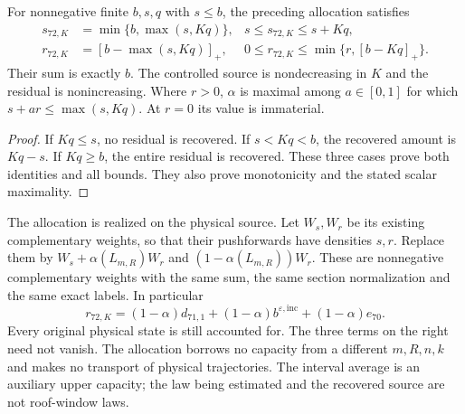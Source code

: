 \begin{lemma}
\label{lem:v72-preserved-recovery}
For nonnegative finite $b,s,q$ with $s\le b$, the preceding
allocation satisfies
\begin{align}
 s_{72,K}&=\min\{b,\max(s,Kq)\},
                  &s\le s_{72,K}\le s+Kq,
                                      \label{eq:v72-controlled-algebra}\\
 r_{72,K}&=[b-\max(s,Kq)]_+,
                  &0\le r_{72,K}\le\min\{r,[b-Kq]_+\}.
                                      \label{eq:v72-residual-algebra}
\end{align}
Their sum is exactly $b$. The controlled source is nondecreasing
in $K$ and the residual is nonincreasing. Where $r>0$, $\alpha$
is maximal among $a\in[0,1]$ for which
$s+ar\le\max(s,Kq)$. At $r=0$ its value is immaterial.
\end{lemma}
\begin{proof}
If $Kq\le s$, no residual is recovered. If $s<Kq<b$, the
recovered amount is $Kq-s$. If $Kq\ge b$, the entire residual
is recovered. These three cases prove both identities and all bounds.
They also prove monotonicity and the stated scalar maximality.
\end{proof}

The allocation is realized on the physical source. Let $W_s,W_r$
be its existing complementary weights, so that their pushforwards
have densities $s,r$. Replace them by
$W_s+\alpha(L_{m,R})W_r$ and
$(1-\alpha(L_{m,R}))W_r$. These are nonnegative complementary
weights with the same sum, the same section normalization and the
same exact labels. In particular
\begin{equation}\label{eq:v72-three-residuals}
 r_{72,K}=(1-\alpha)d_{71,1}
       +(1-\alpha)b^{\varepsilon,\mathrm{inc}}+(1-\alpha)e_{70}.
\end{equation}
Every original physical state is still accounted for. The three terms
on the right need not vanish. The allocation borrows no capacity from
a different $m,R,n,k$ and makes no transport of physical trajectories.
The interval average is an auxiliary upper capacity; the law being
estimated and the recovered source are not roof-window laws.

